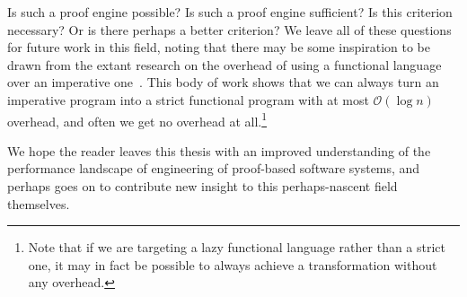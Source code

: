 Is such a proof engine possible?
Is such a proof engine sufficient?
Is this criterion necessary?
Or is there perhaps a better criterion?
We leave all of these questions for future work in this field, noting that there may be some inspiration to be drawn from the extant research on the overhead of using a functional language over an imperative one~\cite{Efficiency2010Campbell,Ben-AmramG92,Ben-amram96noteson,More1997Bird,okasaki1996purely,okasaki1998purely,Pure1997Pippenger}.
This body of work shows that we can always turn an imperative program into a strict functional program with at most $\mathcal O(\log n)$ overhead, and often we get no overhead at all.\footnote{%
  Note that if we are targeting a lazy functional language rather than a strict one, it may in fact be possible to always achieve a transformation without any overhead.%
}

We hope the reader leaves this thesis with an improved understanding of the performance landscape of engineering of proof-based software systems, and perhaps goes on to contribute new insight to this perhaps-nascent field themselves.

